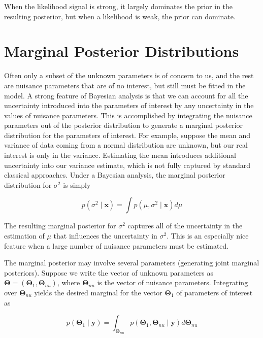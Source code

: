 \documentclass{article}
\begin{document}
When the likelihood signal is strong, it largely dominates the prior in the resulting posterior, but when a likelihood is weak, the prior can dominate.

\section{Marginal Posterior Distributions}
Often only a subset of the unknown parameters is of concern to us, and the rest are nuisance parameters that are of no interest, but still must be fitted in the model. A strong feature of Bayesian analysis is that we can account for all the uncertainty introduced into the parameters of interest by any uncertainty in the values of nuisance parameters. This is accomplished by integrating the nuisance parameters out of the posterior distribution to generate a marginal posterior distribution for the parameters of interest. For example, suppose the mean and variance of data coming from a normal distribution are unknown, but our real interest is only in the variance. Estimating the mean introduces additional uncertainty into our variance estimate, which is not fully captured by standard classical approaches. Under a Bayesian analysis, the marginal posterior distribution for  $ \sigma^2 $ is simply

\begin{equation}
p(\sigma^{2}\mid\mathbf{x})=\int p(\mu,\sigma^{2}\mid\mathbf{x})d\mu
\end{equation}

The resulting marginal posterior for  $ \sigma^{2} $ captures all of the uncertainty in the estimation of  $ \mu $ that influences the uncertainty in  $ \sigma^{2} $. This is an especially nice feature when a large number of nuisance parameters must be estimated.

The marginal posterior may involve several parameters (generating joint marginal posteriors). Suppose we write the vector of unknown parameters as  $ \boldsymbol{\Theta} = (\boldsymbol{\Theta}_1, \boldsymbol{\Theta}_{nu}) $, where  $ \boldsymbol{\Theta}_{nu} $ is the vector of nuisance parameters. Integrating over  $ \boldsymbol{\Theta}_{nu} $ yields the desired marginal for the vector  $ \boldsymbol{\Theta}_1 $ of parameters of interest as

\begin{equation}
p(\boldsymbol{\Theta}_{1}\mid\mathbf{y})=\int_{\boldsymbol{\Theta}_{n u}}p(\boldsymbol{\Theta}_{1},\boldsymbol{\Theta}_{n u}\mid\mathbf{y})d\boldsymbol{\Theta}_{n u}
\end{equation}
\end{document}
